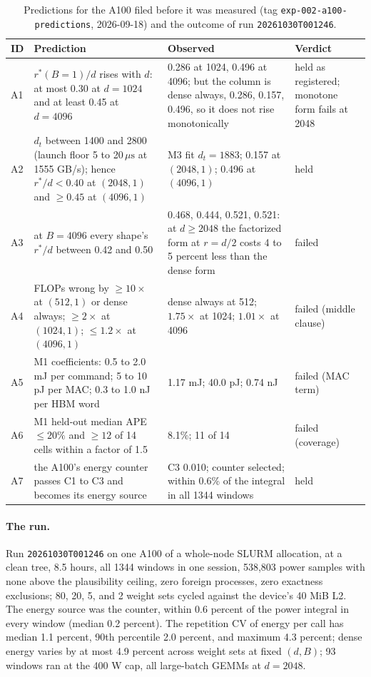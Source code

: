 \documentclass{article}
\newcommand{\rstar}{r^{*}}
\newcommand{\us}{\,\mu\mathrm{s}}
\begin{document}
\begin{table}[t]
\caption{Predictions for the A100 filed before it was measured (tag \texttt{exp-002-a100-predictions}, 2026-09-18) and the outcome of run \texttt{20261030T001246}.}
\label{tab:a100}
\vskip 0.1in
\centering
\small
\begin{tabular}{@{}lp{5.9cm}p{5.9cm}p{2.3cm}@{}}
\toprule
ID & Prediction & Observed & Verdict \\
\midrule
A1 & $\rstar(B{=}1)/d$ rises with $d$: at most 0.30 at $d = 1024$ and at least 0.45 at $d = 4096$ & 0.286 at 1024, 0.496 at 4096; but the column is dense always, 0.286, 0.157, 0.496, so it does not rise monotonically & held as registered; monotone form fails at 2048 \\
A2 & $d_t$ between 1400 and 2800 (launch floor 5 to 20$\us$ at 1555 GB/s); hence $\rstar/d < 0.40$ at $(2048, 1)$ and $\geq 0.45$ at $(4096, 1)$ & M3 fit $d_t = 1883$; 0.157 at $(2048, 1)$; 0.496 at $(4096, 1)$ & held \\
A3 & at $B = 4096$ every shape's $\rstar/d$ between 0.42 and 0.50 & 0.468, 0.444, 0.521, 0.521: at $d \geq 2048$ the factorized form at $r = d/2$ costs 4 to 5 percent less than the dense form & failed \\
A4 & FLOPs wrong by $\geq 10\times$ at $(512, 1)$ or dense always; $\geq 2\times$ at $(1024, 1)$; $\leq 1.2\times$ at $(4096, 1)$ & dense always at 512; $1.75\times$ at 1024; $1.01\times$ at 4096 & failed (middle clause) \\
A5 & M1 coefficients: 0.5 to 2.0 mJ per command; 5 to 10 pJ per MAC; 0.3 to 1.0 nJ per HBM word & 1.17 mJ; 40.0 pJ; 0.74 nJ & failed (MAC term) \\
A6 & M1 held-out median APE $\leq 20\%$ and $\geq 12$ of 14 cells within a factor of 1.5 & 8.1\%; 11 of 14 & failed (coverage) \\
A7 & the A100's energy counter passes C1 to C3 and becomes its energy source & C3 0.010; counter selected; within 0.6\% of the integral in all 1344 windows & held \\
\bottomrule
\end{tabular}
\end{table}

\paragraph{The run.} Run \texttt{20261030T001246} on one A100 of a whole-node SLURM allocation, at a clean tree, 8.5 hours, all 1344 windows in one session, 538,803 power samples with none above the plausibility ceiling, zero foreign processes, zero exactness exclusions; 80, 20, 5, and 2 weight sets cycled against the device's 40 MiB L2. The energy source was the counter, within 0.6 percent of the power integral in every window (median 0.2 percent). The repetition CV of energy per call has median 1.1 percent, 90th percentile 2.0 percent, and maximum 4.3 percent; dense energy varies by at most 4.9 percent across weight sets at fixed $(d, B)$; 93 windows ran at the 400 W cap, all large-batch GEMMs at $d = 2048$.
\end{document}
